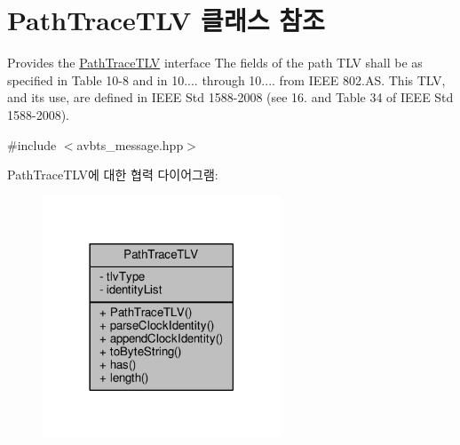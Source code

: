 \hypertarget{class_path_trace_t_l_v}{}\section{Path\+Trace\+T\+LV 클래스 참조}
\label{class_path_trace_t_l_v}


Provides the \hyperlink{class_path_trace_t_l_v}{Path\+Trace\+T\+LV} interface The fields of the path T\+LV shall be as specified in Table 10-\/8 and in 10.... through 10.... from I\+E\+EE 802.\+AS. This T\+LV, and its use, are defined in I\+E\+EE Std 1588-\/2008 (see 16. and Table 34 of I\+E\+EE Std 1588-\/2008).  




{\ttfamily \#include $<$avbts\+\_\+message.\+hpp$>$}



Path\+Trace\+T\+L\+V에 대한 협력 다이어그램\+:
\nopagebreak
\begin{figure}[H]
\begin{center}
\leavevmode
\includegraphics[width=201pt]{class_path_trace_t_l_v__coll__graph}
\end{center}
\end{figure}

